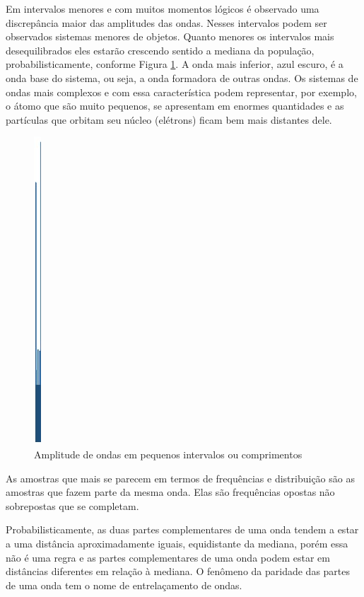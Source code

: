 Em intervalos menores e com muitos momentos lógicos é observado uma discrepância maior das amplitudes das ondas. Nesses intervalos podem ser observados sistemas menores de objetos. Quanto menores os intervalos mais desequilibrados eles estarão crescendo sentido a mediana da população, probabilisticamente, conforme Figura \ref{fig:consciousness_space_subconsciousness_min}. A onda mais inferior, azul escuro, é a onda base do sistema, ou seja, a onda formadora de outras ondas. Os sistemas de ondas mais complexos e com essa característica podem representar, por exemplo, o átomo que são muito pequenos, se apresentam em enormes quantidades e as partículas que orbitam seu núcleo (elétrons) ficam bem mais distantes dele.
	\begin{figure}[H]
	\caption{Amplitude de ondas em pequenos intervalos ou comprimentos}
	\label{fig:consciousness_space_subconsciousness_min}
	\centering
	\includegraphics[scale=.45]{sections/images/consciousness_space_subconsciousness_min.jpg}
	\end{figure}

As amostras que mais se parecem em termos de frequências e distribuição são as amostras que fazem parte da mesma onda. Elas são frequências opostas não sobrepostas que se completam.

Probabilisticamente, as duas partes complementares de uma onda tendem a estar a uma distância aproximadamente iguais, equidistante da mediana, porém essa não é uma regra e as partes complementares de uma onda podem estar em distâncias diferentes em relação à mediana. O fenômeno da paridade das partes de uma onda tem o nome de entrelaçamento de ondas.

